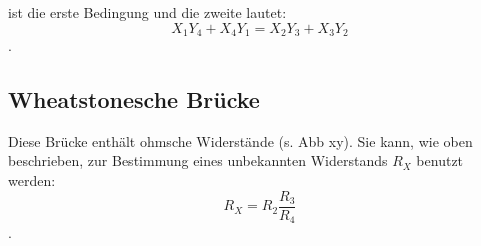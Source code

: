 ist die erste Bedingung und die zweite lautet: 
\begin{equation}
    X_1Y_4 + X_4Y_1 = X_2Y_3 + X_3Y_2 
\end{equation}.

\subsection{Wheatstonesche Brücke}

Diese Brücke enthält ohmsche Widerstände (s. Abb xy). Sie kann, wie oben beschrieben, zur Bestimmung eines unbekannten Widerstands $R_X$ benutzt werden:
\begin{equation}
    R_X = R_2 \frac{R_3}{R_4}
\end{equation}.


